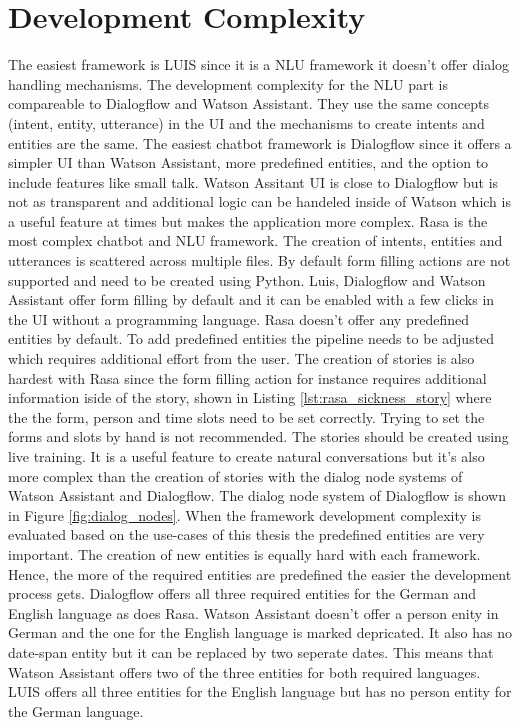 \section*{Development Complexity}
The easiest framework is LUIS since it is a NLU framework it doesn't
offer dialog handling mechanisms.
The development complexity for the NLU part is compareable to Dialogflow and 
Watson Assistant.
They use the same concepts (intent, entity, utterance) in the UI and the 
mechanisms to create intents and entities are the same.
The easiest chatbot framework is Dialogflow since it offers a simpler UI 
than Watson Assistant, more predefined entities, and the option to 
include features like small talk.
Watson Assitant UI is close to Dialogflow but is not as transparent 
and additional logic can be handeled inside of Watson which is a
useful feature at times but makes the application more complex.
Rasa is the most complex chatbot and NLU framework.
The creation of intents, entities and utterances is scattered across multiple files.
By default form filling actions are not supported and need to be created using Python.
Luis, Dialogflow and Watson Assistant offer form filling by default and it can be enabled with a 
few clicks in the UI without a programming language.
Rasa doesn't offer any predefined entities  by default.
To add predefined entities the pipeline needs to be adjusted which requires additional effort 
from the user.
The creation of stories is also hardest with Rasa since the form filling action for instance 
requires additional information iside of the story, shown in Listing \ref{lst:rasa_sickness_story}
where the the form, person and time slots need to be set correctly.
Trying to set the forms and slots by hand is not recommended.
The stories should be created using live training.
It is a useful feature to create natural conversations but it's also more complex than the 
creation of stories with the dialog node systems of Watson Assistant and Dialogflow.
The dialog node system of Dialogflow is shown in Figure \ref{fig:dialog_nodes}.
When the framework development complexity is evaluated based on the use-cases of this thesis 
the predefined entities are very important.
The creation of new entities is equally hard with each framework.
Hence, the more of the required entities are predefined the easier the development process gets.
Dialogflow offers all three required entities for the German and English language as does 
Rasa.
Watson Assistant doesn't offer a person enity in German and the one for the English language is marked depricated.
It also has no date-span entity but it can be replaced by two seperate dates.
This means that Watson Assistant offers two of the three entities for both required languages. 
LUIS offers all three entities for the English language but has no person entity for the German language. 



